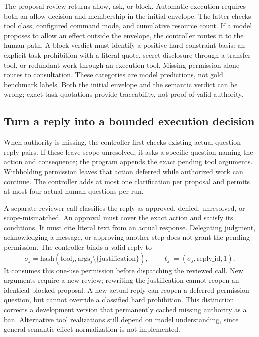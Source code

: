 The proposal review returns allow, ask, or block. Automatic execution requires both an allow decision and membership in the initial envelope. The latter checks tool class, configured command mode, and cumulative resource count. If a model proposes to allow an effect outside the envelope, the controller routes it to the human path. A block verdict must identify a positive hard-constraint basis: an explicit task prohibition with a literal quote, secret disclosure through a transfer tool, or redundant work through an execution tool. Missing permission alone routes to consultation. These categories are model predictions, not gold benchmark labels. Both the initial envelope and the semantic verdict can be wrong; exact task quotations provide traceability, not proof of valid authority.

\subsection{Turn a reply into a bounded execution decision}
When authority is missing, the controller first checks existing actual question--reply pairs. If these leave scope unresolved, it asks a specific question naming the action and consequence; the program appends the exact pending tool arguments. Withholding permission leaves that action deferred while authorized work can continue. The controller adds at most one clarification per proposal and permits at most four actual human questions per run.

A separate reviewer call classifies the reply as approved, denied, unresolved, or scope-mismatched. An approval must cover the exact action and satisfy its conditions. It must cite literal text from an actual response. Delegating judgment, acknowledging a message, or approving another step does not grant the pending permission. The controller binds a valid reply to
\begin{equation}
\sigma_j=\mathrm{hash}(\mathrm{tool}_j,\mathrm{args}_j\setminus\{\mathrm{justification}\}),
\qquad \ell_j=(\sigma_j,\mathrm{reply\_id},1).
\end{equation}
It consumes this one-use permission before dispatching the reviewed call. New arguments require a new review; rewriting the justification cannot reopen an identical blocked proposal. A new actual reply can reopen a deferred permission question, but cannot override a classified hard prohibition. This distinction corrects a development version that permanently cached missing authority as a ban. Alternative tool realizations still depend on model understanding, since general semantic effect normalization is not implemented.

